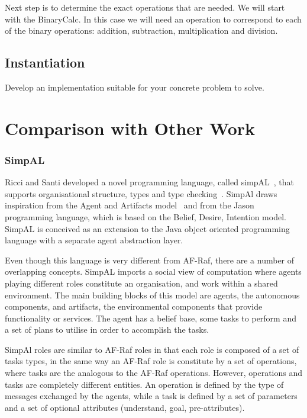 \documentclass[a4paper,12pt,oneside,fleqn]{book} %
\begin{document}
Next step is to determine the exact operations that are needed. We will
start with the BinaryCalc. In this case we will need an operation to
correspond to each of the binary operations: addition, subtraction, multiplication
and division.

\subsection{Instantiation} %
Develop an implementation suitable for your concrete problem to solve.
\section{Comparison with Other Work}\label{ch:related} %

\subsubsection{SimpAL} %
Ricci  and Santi developed a novel programming language, called
simpAL~\cite{DBLP:conf/oopsla/RicciS11,DBLP:conf/oopsla/RicciS12}, that
supports organisational structure, types and type
checking~\cite{DBLP:conf/promas/RicciS12}. SimpAl draws inspiration from
the Agent and Artifacts model~\cite{DBLP:conf/atal/RicciVO07} and from the
Jason programming language, which is based on the Belief, Desire, Intention
model. SimpAL is conceived as an extension to the Java object oriented
programming language with a separate agent abstraction layer.

Even though this language is very different from AF-Raf, there are a number
of overlapping concepts. SimpAL imports a social view of computation where
agents playing different roles constitute an organisation, and work within
a shared environment. The main building blocks of this model are agents,
the autonomous components, and artifacts, the environmental components that
provide functionality or services. The agent has a belief base, some tasks
to perform and a set of plans to utilise in order to accomplish the tasks.

SimpAl roles are similar to AF-Raf roles in that each role is composed of a
set of tasks types, in the same way an AF-Raf role is constitute by a set
of operations, where tasks are the analogous to the AF-Raf operations.
However, operations and tasks are completely different entities. An
operation is defined by the type of messages exchanged by the agents, while
a task is defined by a set of parameters and a set of optional attributes
(understand, goal, pre-attributes).
\end{document}
